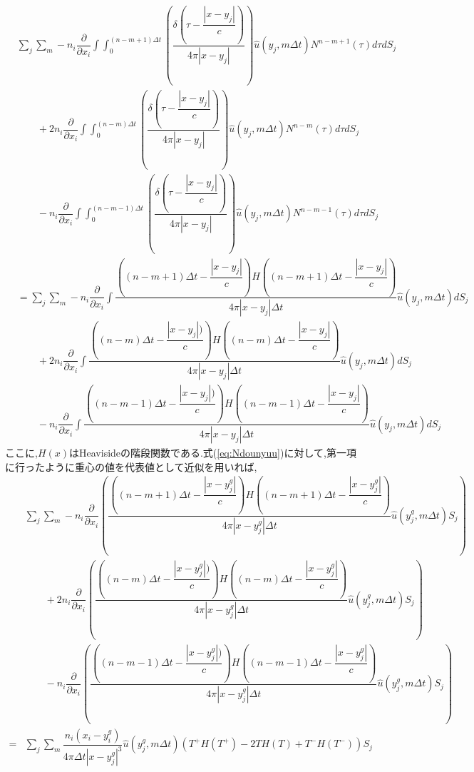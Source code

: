 \documentclass[dvipdfmx]{ampbt}
\begin{document}
\begin{align}
\label{eq:Ndounyuu}
&\sum_j \sum_m -n_i\dfrac{\partial}{\partial x_i}\int\!\!\!  \int_{0}^{(n-m+1)\Delta t} \left( \dfrac{\delta(\tau- \dfrac{|x-y_j|}{c})}{4\pi|x-y_j|} \right) \hat{u}(y_j,m\Delta t)N^{n-m+1}(\tau)d\tau dS_j \nonumber\\
&\hspace{2em} +2n_i\dfrac{\partial}{\partial x_i}\int\!\!\!  \int_{0}^{(n-m)\Delta t} \left( \dfrac{\delta(\tau- \dfrac{|x-y_j|}{c})}{4\pi|x-y_j|} \right) \hat{u}(y_j,m\Delta t)N^{n-m}(\tau)d\tau dS_j \nonumber \\
&\hspace{2em} -n_i\dfrac{\partial}{\partial x_i}\int\!\!\!  \int_{0}^{(n-m-1)\Delta t} \left( \dfrac{\delta(\tau- \dfrac{|x-y_j|}{c})}{4\pi|x-y_j|} \right) \hat{u}(y_j,m\Delta t)N^{n-m-1}(\tau)d\tau dS_j \nonumber\\
&= \sum_j \sum_m -n_i\dfrac{\partial}{\partial x_i}\int\!\!\! \dfrac{( (n-m+1)\Delta t - \dfrac{|x-y_j|}{c} )H((n-m+1)\Delta t - \dfrac{|x-y_j|}{c} )}{4\pi|x-y_j|\Delta t} \hat{u}(y_j,m\Delta t) dS_j \nonumber\\
&\hspace{2em} +2n_i\dfrac{\partial}{\partial x_i}\int\!\!\!  \dfrac{( (n-m)\Delta t- \dfrac{|x-y_j|)}{c} )H((n-m)\Delta t - \dfrac{|x-y_j|}{c} )}{4\pi|x-y_j|\Delta t}  \hat{u}(y_j,m\Delta t) dS_j \nonumber \\
&\hspace{2em} -n_i\dfrac{\partial}{\partial x_i}\int\!\!\!  \dfrac{( (n-m-1)\Delta t - \dfrac{|x-y_j|)}{c} )H((n-m-1)\Delta t - \dfrac{|x-y_j|}{c})}{4\pi|x-y_j|\Delta t}  \hat{u}(y_j,m\Delta t) dS_j
\end{align}
ここに,$H(x)$はHeavisideの階段関数である.式(\ref{eq:Ndounyuu})に対して,第一項に行ったように重心の値を代表値として近似を用いれば,
\begin{align}
\label{eq:ヘヴィサイド後}
&\sum_j \sum_m -n_i\dfrac{\partial}{\partial x_i} \left(\dfrac{( (n-m+1)\Delta t - \dfrac{|x-y^g_j|}{c} )H((n-m+1)\Delta t - \dfrac{|x-y^g_j|}{c} )}{4\pi|x-y^g_j|\Delta t} \hat{u}(y^g_j,m\Delta t) S_j \right) \nonumber\\
&\hspace{2em} +2n_i\dfrac{\partial}{\partial x_i}\left(\dfrac{( (n-m)\Delta t- \dfrac{|x-y^g_j|)}{c} )H((n-m)\Delta t - \dfrac{|x-y^g_j|}{c} )}{4\pi|x-y^g_j|\Delta t}  \hat{u}(y^g_j,m\Delta t) S_j \right) \nonumber \\
&\hspace{2em} -n_i\dfrac{\partial}{\partial x_i}\left(\dfrac{( (n-m-1)\Delta t - \dfrac{|x-y^g_j|)}{c} )H((n-m-1)\Delta t - \dfrac{|x-y^g_j|}{c})}{4\pi|x-y^g_j|\Delta t}  \hat{u}(y^g_j,m\Delta t) S_j \right) \nonumber \\
=&\sum_j \sum_m \dfrac{n_i(x_i-y^g_i)}{4\pi \Delta t |x-y^g_j|^3}  \hat{u}(y^g_j,m\Delta t)(T^+H(T^+)-2TH(T)+T^-H(T^-) ) S_j  \nonumber\\
\end{align}
\end{document}
